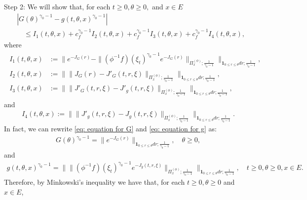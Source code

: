 \documentclass[12pt,a4paper]{amsart}
\theoremstyle{definition}
\numberwithin{equation}{section}
\begin{document}
Step 2: We will show that, for each $t\geq 0, \theta \geq 0,$ and $x\in E$
\begin{align}
	&| G(\theta)^{\gamma_0 - 1} - g(t,\theta,x)^{\gamma_0 - 1} |
	\\ & \quad \leq I_1(t,\theta,x) +c^{\gamma_0 - 1}_f I_2(t,\theta,x) + c^{\gamma_0 - 1}_f I_3(t,\theta,x) + c^{\gamma_0 - 1}_f I_4(t,\theta,x),
\end{align}
where
\begin{align}
\begin{aligned}
	I_1(t,\theta,x)
	&:= \Big\| e^{ - J_G(r)} - \| (\phi^{-1}f)(\xi_t)^{\gamma_0 - 1} e^{-J_G(r)} \|_{\Pi_x^{(\phi)};\frac{1}{\gamma_0 - 1}} \Big\|_{\mathbf 1_{0\leq r\leq \theta} dr;\frac{1}{\gamma_0 - 1}} ,
	\\I_2(t,\theta,x)
	&:= \Big\|  \|  J_G(r) - J'_G(t,r,\xi)  \|_{\Pi_x^{(\phi)};\frac{1}{\gamma_0 - 1}} \Big\|_{\mathbf 1_{0\leq r\leq \theta} dr;\frac{1}{\gamma_0 - 1}},
	\\I_3(t,\theta,x)
	&:= \Big\| \|  J'_G(t,r,\xi) - J'_g(t,r,\xi)  \|_{\Pi_x^{(\phi)};\frac{1}{\gamma_0 - 1}} \Big\|_{\mathbf 1_{0\leq r\leq \theta} dr;\frac{1}{\gamma_0 - 1}},
\end{aligned}
\end{align}
and
\begin{align}
	I_4(t,\theta,x)
	:= \Big\| \| J'_g(t,r,\xi) - J_g(t,r,\xi)  \|_{\Pi_x^{(\phi)};\frac{1}{\gamma_0 - 1}} \Big\|_{\mathbf 1_{0\leq r\leq \theta} dr;\frac{1}{\gamma_0 - 1}}.
\end{align}
In fact, we can rewrite \eqref{eq: equation for G} and \eqref{eq: equation for g} as:
\begin{align}
	G(\theta)^{\gamma_0 - 1} =
	\| e^{ - J_G(r)} \|_{\mathbf 1_{0\leq r\leq \theta} dr;\frac{1}{\gamma_0 - 1}},
	\quad \theta \geq 0,
\end{align}	
and
\begin{align}
	g(t,\theta,x)^{\gamma_0 - 1}
	=\Big\| \| (\phi^{-1}f)(\xi_t) ^{\gamma_0 - 1} e^{-J_g(t,r,\xi)} \|_{\Pi_x^{(\phi)};\frac{1}{\gamma_0 - 1}} \Big\|_{\mathbf 1_{0\leq r\leq \theta} dr;\frac{1}{\gamma_0 - 1}},
	\quad t\geq 0, \theta \geq 0, x\in E.
\end{align}	
Therefore, by Minkowski's inequality we have that, for each $t\geq 0, \theta \geq 0$ and $x\in E$,
\end{document}
